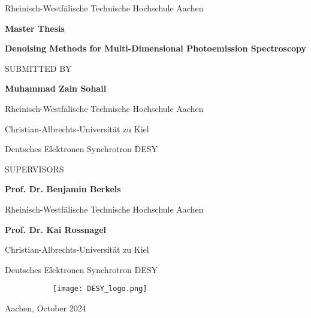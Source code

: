 \begin{titlepage}
    \begin{center}
        Rheinisch-Westfälische Technische Hochschule Aachen
        \vspace{0.2cm}
        
        \Large
        \textbf{Master Thesis}
            
        \vspace{0.5cm}
        \Large
        \textbf{Denoising Methods for Multi-Dimensional Photoemission Spectroscopy}
        
        \normalsize   
        \vspace{1cm}
        SUBMITTED BY
        \vspace{0.3cm} 
        
        \large
        \textbf{Muhammad Zain Sohail}
        
        \normalsize
        Rheinisch-Westfälische Technische Hochschule Aachen
        
        Christian-Albrechts-Universität zu Kiel
        
        Deutsches Elektronen Synchrotron DESY
        
        \normalsize
        \vspace{1cm}         
        SUPERVISORS
        
        \large
        \vspace{0.3cm}

        \textbf{Prof. Dr. Benjamin Berkels }
        
        \normalsize
        Rheinisch-Westfälische Technische Hochschule Aachen
        
        
        \vspace{0.3cm}
        \large 
        \textbf{Prof. Dr. Kai Rossnagel}
        
        \normalsize
        Christian-Albrechts-Universität zu Kiel

        Deutsches Elektronen Synchrotron DESY
            
        \vfill
            
        \begin{figure}[h]
            \begin{subfigure}{0.25\textwidth}
                \texttt{[image: DESY\_logo.png]}
            \end{subfigure}
        \end{figure}
        
        \vspace{0.3cm}
        Aachen, October 2024
            
    \end{center}
\end{titlepage}